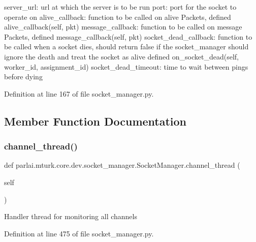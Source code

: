 \begin{DoxyVerb}server_url:           url at which the server is to be run
port:                 port for the socket to operate on
alive_callback:       function to be called on alive Packets, defined
               alive_callback(self, pkt)
message_callback:     function to be called on message Packets, defined
               message_callback(self, pkt)
socket_dead_callback: function to be called when a socket dies, should
              return false if the socket_manager should ignore
              the death and treat the socket as alive defined
               on_socket_dead(self, worker_id, assignment_id)
socket_dead_timeout:  time to wait between pings before dying
\end{DoxyVerb}
 

Definition at line 167 of file socket\+\_\+manager.\+py.



\subsection{Member Function Documentation}
\mbox{\label{classparlai_1_1mturk_1_1core_1_1dev_1_1socket__manager_1_1SocketManager_a77dba972ee1a8e3dc165d2531864d974}} 
\subsubsection{\texorpdfstring{channel\+\_\+thread()}{channel\_thread()}}
{\footnotesize\ttfamily def parlai.\+mturk.\+core.\+dev.\+socket\+\_\+manager.\+Socket\+Manager.\+channel\+\_\+thread (\begin{DoxyParamCaption}\item[{}]{self }\end{DoxyParamCaption})}

\begin{DoxyVerb}Handler thread for monitoring all channels\end{DoxyVerb}
 

Definition at line 475 of file socket\+\_\+manager.\+py.



